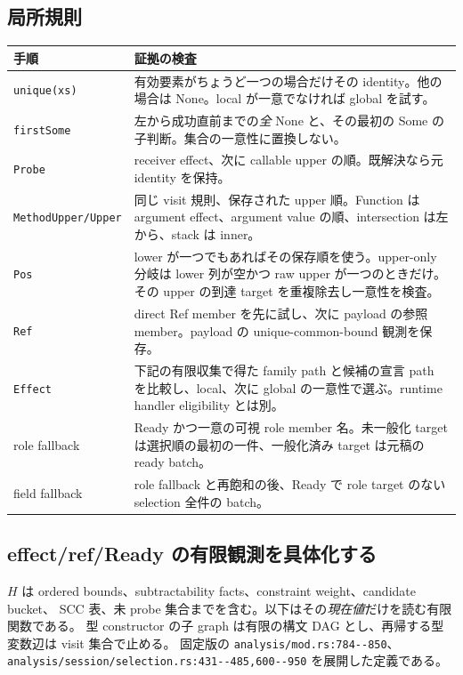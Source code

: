 \documentclass[11pt,a4paper]{article}
\begin{document}
\subsection{局所規則}

\begin{longtable}{p{}p{}}
\toprule 手順 & 証拠の検査 \\
\midrule\endhead
\texttt{unique(xs)} & 有効要素がちょうど一つの場合だけその identity。他の場合は None。local が一意でなければ global を試す。\\
\texttt{firstSome} & 左から成功直前までの\emph{全} None と、その最初の Some の子判断。集合の一意性に置換しない。\\
\texttt{Probe} & receiver effect、次に callable upper の順。既解決なら元 identity を保持。\\
\texttt{MethodUpper/Upper} & 同じ visit 規則、保存された upper 順。Function は argument effect、argument value の順、intersection は左から、stack は inner。\\
\texttt{Pos} & lower が一つでもあればその保存順を使う。upper-only 分岐は lower 列が空かつ raw upper が一つのときだけ。その upper の到達 target を重複除去し一意性を検査。\\
\texttt{Ref} & direct Ref member を先に試し、次に payload の参照 member。payload の unique-common-bound 観測を保存。\\
\texttt{Effect} & 下記の有限収集で得た family path と候補の宣言 path を比較し、local、次に global の一意性で選ぶ。runtime handler eligibility とは別。\\
role fallback & Ready かつ一意の可視 role member 名。未一般化 target は選択順の最初の一件、一般化済み target は元稿の ready batch。\\
field fallback & role fallback と再飽和の後、Ready で role target のない selection 全件の batch。\\
\bottomrule
\end{longtable}

\subsection{effect/ref/Ready の有限観測を具体化する}

\(H\) は ordered bounds、subtractability facts、constraint weight、candidate bucket、
SCC 表、未 probe 集合までを含む。以下はその\emph{現在値}だけを読む有限関数である。
型 constructor の子 graph は有限の構文 DAG とし、再帰する型変数辺は visit 集合で止める。
固定版の \nolinkurl{analysis/mod.rs:784--850}、
\nolinkurl{analysis/session/selection.rs:431--485,600--950} を展開した定義である。
\end{document}
